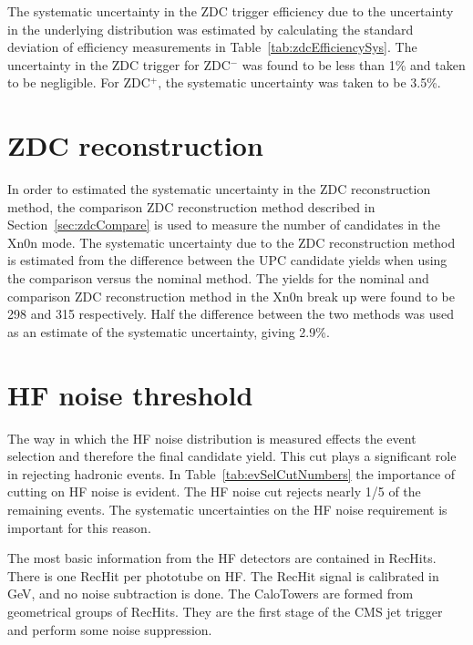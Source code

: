     The systematic uncertainty in the ZDC trigger efficiency due to the 
      uncertainty in the underlying distribution was estimated by calculating 
      the standard deviation of efficiency measurements in Table~\ref{tab:zdcEfficiencySys}.
    The uncertainty in the ZDC trigger for ZDC$^{-}$ was found to be less than 
      1\% and taken to be negligible. 
    For ZDC$^{+}$, the systematic uncertainty was taken to be 3.5\%.

  \section{ZDC reconstruction}
    In order to estimated the systematic uncertainty in the ZDC reconstruction
      method, the comparison ZDC reconstruction method described in 
      Section~\ref{sec:zdcCompare} is used to measure the number of candidates
      in the Xn0n mode.
    The systematic uncertainty due to the ZDC reconstruction method is
      estimated from the difference between the UPC \JPsi{} candidate yields 
      when using the comparison versus the nominal method.
    The yields for the nominal and comparison ZDC reconstruction method in the 
      Xn0n break up were found to be 298 and 315 respectively. 
    Half the difference between the two methods was used as an estimate of 
      the systematic uncertainty, giving 2.9\%.

  \section{HF noise threshold}
    The way in which the HF noise distribution is measured effects the event 
      selection and therefore the final candidate yield.
    This cut plays a significant role in rejecting hadronic events.
    In Table~\ref{tab:evSelCutNumbers} the importance of cutting on HF noise
      is evident. 
    The HF noise cut rejects nearly 1/5 of the remaining events. 
    The systematic uncertainties on the HF noise requirement is important for
      this reason.
   
    The most basic information from the HF detectors are contained in RecHits. 
    There is one RecHit per phototube on HF. 
    The RecHit signal is calibrated in GeV, and no noise subtraction is done. 
    The CaloTowers are formed from geometrical groups of RecHits. 
    They are the first stage of the CMS jet trigger and perform some noise 
      suppression.

